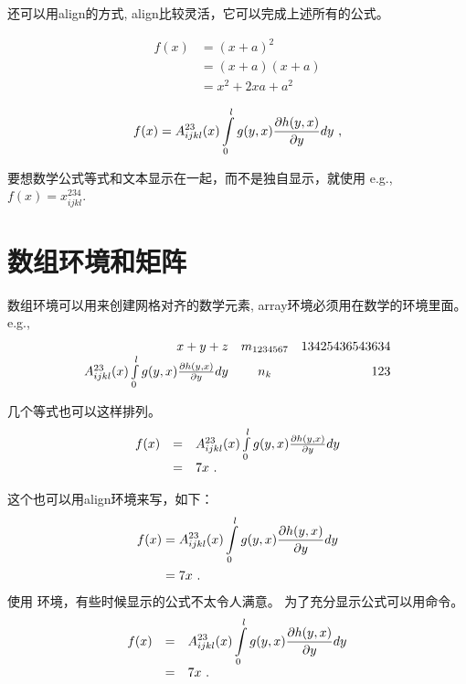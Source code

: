 还可以用align的方式, align比较灵活，它可以完成上述所有的公式。

\begin{align*}
	f(x)
		&= (x+a)^2 \\
		&= (x+a)(x+a) \\
		&= x^2 + 2 x a + a^2
\end{align*}

\begin{align}
	f(x)
	= A^{23}_{ijkl}(x) \int_0^l\limits g(y,x) \frac{\partial h(y,x)}{\partial y} d y \ ,
\end{align}

要想数学公式等式和文本显示在一起，而不是独自显示，就使用 \imp{\$\$} e.g., $f(x) = x^{234}_{ijkl}$.


\section{数组环境和矩阵}

数组环境可以用来创建网格对齐的数学元素, array环境必须用在数学的环境里面。e.g.,
\begin{equation}
	\begin{array}{rcr}
	x + y + z 
		& m_{1234567} 
		& 13425436543634 \\
	A^{23}_{ijkl}(x) \int_0^l\limits g(y,x) \frac{\partial h(y,x)}{\partial y} d y 
		& n_{k} 
		& 123
	\end{array}
\end{equation}

几个等式也可以这样排列。
\begin{equation}
	\begin{array}{rcl}
	f(x)
	&=& A^{23}_{ijkl}(x) \int_0^l\limits g(y,x) \frac{\partial h(y,x)}{\partial y} d y \\
	&=& 7 x \ .
	\end{array}
\end{equation}

这个也可以用align环境来写，如下：
\begin{align*}
	f(x)
	&= A^{23}_{ijkl}(x) \int_0^l\limits g(y,x) \frac{\partial h(y,x)}{\partial y} d y \\
	&= 7 x \ .
\end{align*}
使用  环境，有些时候显示的公式不太令人满意。
为了充分显示公式可以用命令。 
\begin{equation}
	\begin{array}{rcl}
	f(x)
	&=& \displaystyle A^{23}_{ijkl}(x) \int_0^l\limits g(y,x) \frac{\partial h(y,x)}{\partial y} d y \\
	&=& 7 x \ .
	\end{array}
\end{equation} 

